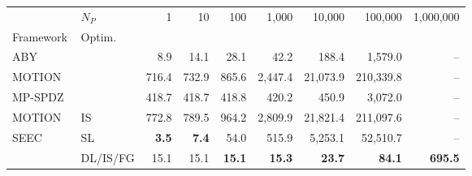 \begin{tabular}{llrrrrrrr}
\toprule
 & $N_P$ & 1 & 10 & 100 & 1,000 & 10,000 & 100,000 & 1,000,000 \\
Framework & Optim. &  &  &  &  &  &  &  \\
\midrule
ABY~\cite{DSZ15} &  & 8.9 & 14.1 & 28.1 & 42.2 & 188.4 & 1,579.0 & -- \\
\cline{1-9}
MOTION~\cite{BDST22} &  & 716.4 & 732.9 & 865.6 & 2,447.4 & 21,073.9 & 210,339.8 & -- \\
\cline{1-9}
MP-SPDZ~\cite{CCS:Keller20} &  & 418.7 & 418.7 & 418.8 & 420.2 & 450.9 & 3,072.0 & -- \\
\cline{1-9}
MOTION~\cite{BDST22} & IS & 772.8 & 789.5 & 964.2 & 2,809.9 & 21,821.4 & 211,097.6 & -- \\
\cline{1-9}
\multirow[c]{2}{*}{SEEC} & SL & \bfseries 3.5 & \bfseries 7.4 & 54.0 & 515.9 & 5,253.1 & 52,510.7 & -- \\
 & DL/IS/FG & 15.1 & 15.1 & \bfseries 15.1 & \bfseries 15.3 & \bfseries 23.7 & \bfseries 84.1 & \bfseries 695.5 \\
\bottomrule
\end{tabular}
